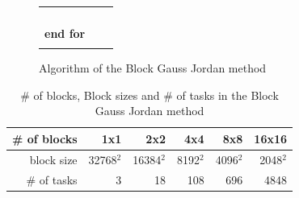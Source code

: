 \documentclass[graybox]{svmult}
\begin{document}
\begin{figure}[t]
\begin{center}
\begin{tabular}[t]{|ccc|}
\begin{minipage}[c]{0.5\hsize}
\hspace*{1.2em}\hspace*{1.2em}\hspace*{1.2em}\hspace*{1.2em}{\bf end for}\\
\hspace*{1.2em}\hspace*{1.2em}\hspace*{1.2em}{\bf end if}\\
\hspace*{1.2em}\hspace*{1.2em}{\bf end for}\\
\hspace*{1.2em}{\bf end if}\\
{\bf end for}\\
\end{minipage}
&\hspace*{3mm}
\\\hline
\end{tabular}
\caption{Algorithm of the Block Gauss Jordan method}
\label{fig:block-gauss-jordan-algorithm}
\end{center}
\end{figure}

\begin{table}[t]
\begin{center}
\caption{\# of blocks, Block sizes and \# of tasks in the Block Gauss Jordan method}
\label{table:num blocks}
 \begin{tabular}[t]{r|r|r|r|r|r}\hline\hline
\# of blocks  & 1x1 & 2x2 & 4x4& 8x8& 16x16\\\hline
block size    & 32768$^2$ & 16384$^2$ & 8192$^2$ & 4096$^2$ & 2048$^2$ \\\hline
\# of tasks   & 3 & 18 & 108 & 696 & 4848 \\\hline
 \end{tabular}
\end{center}
\end{table}
 
\end{document}
